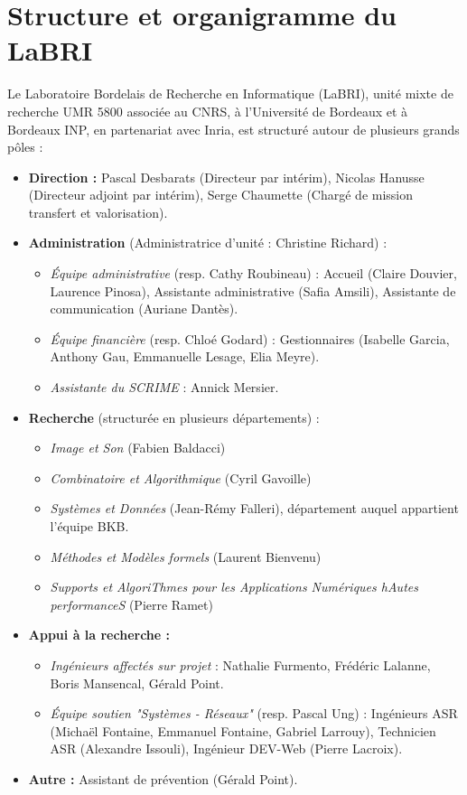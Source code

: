 \section{Structure et organigramme du LaBRI}
\label{annexe:labri}

Le Laboratoire Bordelais de Recherche en Informatique (LaBRI), unité mixte de recherche UMR 5800 associée au CNRS, à l'Université de Bordeaux et à Bordeaux INP, en partenariat avec Inria, est structuré autour de plusieurs grands pôles :
\begin{itemize}
    \item \textbf{Direction :} Pascal Desbarats (Directeur par intérim), Nicolas Hanusse (Directeur adjoint par intérim), Serge Chaumette (Chargé de mission transfert et valorisation).
    \item \textbf{Administration} (Administratrice d'unité : Christine Richard) :
    \begin{itemize}
        \item \textit{Équipe administrative} (resp. Cathy Roubineau) : Accueil (Claire Douvier, Laurence Pinosa), Assistante administrative (Safia Amsili), Assistante de communication (Auriane Dantès).
        \item \textit{Équipe financière} (resp. Chloé Godard) : Gestionnaires (Isabelle Garcia, Anthony Gau, Emmanuelle Lesage, Elia Meyre).
        \item \textit{Assistante du SCRIME} : Annick Mersier.
    \end{itemize}
    \item \textbf{Recherche} (structurée en plusieurs départements) :
    \begin{itemize}
        \item \textit{Image et Son} (Fabien Baldacci)
        \item \textit{Combinatoire et Algorithmique} (Cyril Gavoille)
        \item \textit{Systèmes et Données} (Jean-Rémy Falleri), département auquel appartient l'équipe BKB.
        \item \textit{Méthodes et Modèles formels} (Laurent Bienvenu)
        \item \textit{Supports et AlgoriThmes pour les Applications Numériques hAutes performanceS} (Pierre Ramet)
    \end{itemize}
    \item \textbf{Appui à la recherche :}
    \begin{itemize}
        \item \textit{Ingénieurs affectés sur projet} : Nathalie Furmento, Frédéric Lalanne, Boris Mansencal, Gérald Point.
        \item \textit{Équipe soutien "Systèmes - Réseaux"} (resp. Pascal Ung) : Ingénieurs ASR (Michaël Fontaine, Emmanuel Fontaine, Gabriel Larrouy), Technicien ASR (Alexandre Issouli), Ingénieur DEV-Web (Pierre Lacroix).
    \end{itemize}
    \item \textbf{Autre :} Assistant de prévention (Gérald Point).
\end{itemize}

